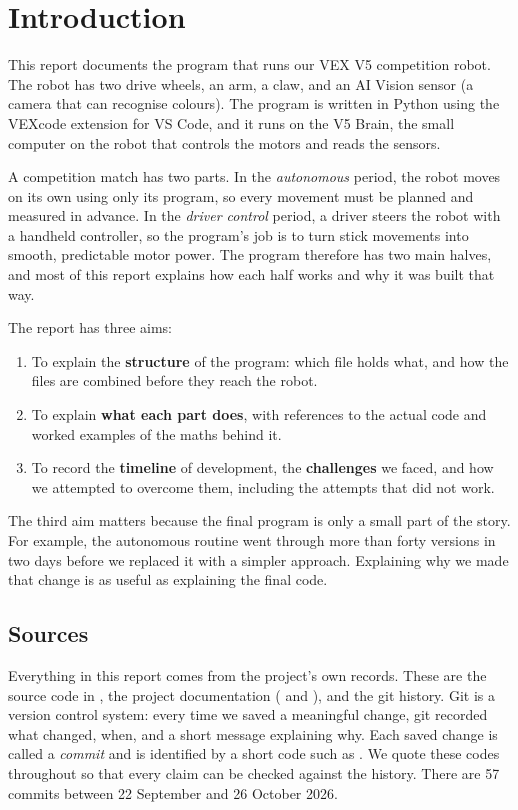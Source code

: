 \chapter{Introduction}
\label{ch:intro}

This report documents the program that runs our VEX V5 competition robot. The
robot has two drive wheels, an arm, a claw, and an AI Vision sensor (a camera
that can recognise colours). The program is written in Python using the VEXcode
extension for VS Code, and it runs on the V5 Brain, the small computer on the
robot that controls the motors and reads the sensors.

A competition match has two parts. In the \emph{autonomous} period, the robot
moves on its own using only its program, so every movement must be planned and
measured in advance. In the \emph{driver control} period, a driver steers the
robot with a handheld controller, so the program's job is to turn stick
movements into smooth, predictable motor power. The program therefore has two
main halves, and most of this report explains how each half works and why it
was built that way.

The report has three aims:

\begin{enumerate}
  \item To explain the \textbf{structure} of the program: which file holds what,
    and how the files are combined before they reach the robot.
  \item To explain \textbf{what each part does}, with references to the actual
    code and worked examples of the maths behind it.
  \item To record the \textbf{timeline} of development, the \textbf{challenges}
    we faced, and how we attempted to overcome them, including the attempts
    that did not work.
\end{enumerate}

The third aim matters because the final program is only a small part of the
story. For example, the autonomous routine went through more than forty
versions in two days before we replaced it with a simpler approach. Explaining
why we made that change is as useful as explaining the final code.

\section{Sources}

Everything in this report comes from the project's own records. These are the
source code in , the project documentation ( and
), and the git history. Git is a version control system: every
time we saved a meaningful change, git recorded what changed, when, and a short
message explaining why. Each saved change is called a \emph{commit} and is
identified by a short code such as . We quote these codes
throughout so that every claim can be checked against the history. There are
57 commits between 22 September and 26 October 2026.

